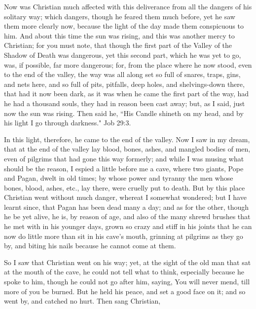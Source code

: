 Now was Christian much affected with this deliverance from all the dangers of his solitary way; which dangers, though he feared them much before, yet he saw them more clearly now, because the light of the day made them conspicuous to him. And about this time the sun was rising, and this was another mercy to Christian; for you must note, that though the first part of the Valley of the Shadow of Death was dangerous, yet this second part, which he was yet to go, was, if possible, far more dangerous; for, from the place where he now stood, even to the end of the valley, the way was all along set so full of snares, traps, gins, and nets here, and so full of pits, pitfalls, deep holes, and shelvings-down there, that had it now been dark, as it was when he came the first part of the way, had he had a thousand souls, they had in reason been cast away; but, as I said, just now the sun was rising. Then said he, ``His Candle shineth on my head, and by his light I go through darkness." Job 29:3.

In this light, therefore, he came to the end of the valley. Now I saw in my dream, that at the end of the valley lay blood, bones, ashes, and mangled bodies of men, even of pilgrims that had gone this way formerly; and while I was musing what should be the reason, I espied a little before me a cave, where two giants, Pope and Pagan, dwelt in old times; by whose power and tyranny the men whose bones, blood, ashes, etc., lay there, were cruelly put to death. But by this place Christian went without much danger, whereat I somewhat wondered; but I have learnt since, that Pagan has been dead many a day; and as for the other, though he be yet alive, he is, by reason of age, and also of the many shrewd brushes that he met with in his younger days, grown so crazy and stiff in his joints that he can now do little more than sit in his cave's mouth, grinning at pilgrims as they go by, and biting his nails because he cannot come at them.

So I saw that Christian went on his way; yet, at the sight of the old man that sat at the mouth of the cave, he could not tell what to think, especially because he spoke to him, though he could not go after him, saying, You will never mend, till more of you be burned. But he held his peace, and set a good face on it; and so went by, and catched no hurt. Then sang Christian,

